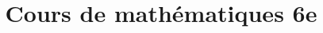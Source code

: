 \documentclass{scrbook}
\title{Cours de mathématiques 6e}
\begin{document}
\maketitle

\renewcommand{\onlyinsubfile}{}



\end{document}

